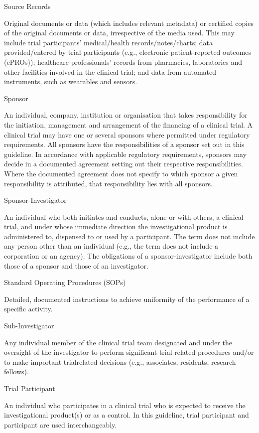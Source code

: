 \documentclass[11pt]{article}
\begin{document}
Source Records


Original documents or data (which includes relevant metadata) or certified copies of the original documents or data, irrespective of the media used. This may include trial participants' medical/health records/notes/charts; data provided/entered by trial participants (e.g., electronic patient-reported outcomes (ePROs)); healthcare professionals' records from pharmacies, laboratories and other facilities involved in the clinical trial; and data from automated instruments, such as wearables and sensors.


Sponsor


An individual, company, institution or organisation that takes responsibility for the initiation, management and arrangement of the financing of a clinical trial. A clinical trial may have one or several sponsors where permitted under regulatory requirements. All sponsors have the responsibilities of a sponsor set out in this guideline. In accordance with applicable regulatory requirements, sponsors may decide in a documented agreement setting out their respective responsibilities. Where the documented agreement does not specify to which sponsor a given responsibility is attributed, that responsibility lies with all sponsors.


Sponsor-Investigator


An individual who both initiates and conducts, alone or with others, a clinical trial, and under whose immediate direction the investigational product is administered to, dispensed to or used by a participant. The term does not include any person other than an individual (e.g., the term does not include a corporation or an agency). The obligations of a sponsor-investigator include both those of a sponsor and those of an investigator.


Standard Operating Procedures (SOPs)


Detailed, documented instructions to achieve uniformity of the performance of a specific activity.


Sub-Investigator


Any individual member of the clinical trial team designated and under the oversight of the investigator to perform significant trial-related procedures and/or to make important trialrelated decisions (e.g., associates, residents, research fellows).


Trial Participant


An individual who participates in a clinical trial who is expected to receive the investigational product(s) or as a control. In this guideline, trial participant and participant are used interchangeably.
\end{document}

